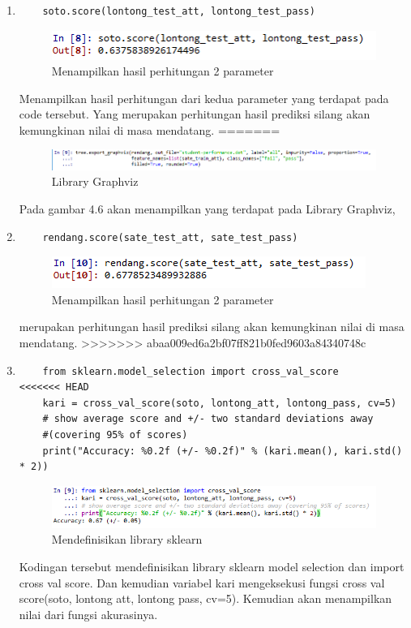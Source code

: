 \begin{enumerate}
\item
\begin{verbatim}
	soto.score(lontong_test_att, lontong_test_pass)
\end{verbatim}
\begin{figure}[ht]
\centering
\includegraphics[scale=0.9]{figures/lontong/8.png}
\caption{Menampilkan hasil perhitungan 2 parameter}
\end{figure}
\par
	Menampilkan hasil perhitungan dari kedua parameter yang terdapat pada code tersebut. Yang merupakan perhitungan hasil prediksi silang akan kemungkinan nilai di masa mendatang.
=======
\begin{figure}[ht]
\centering
\includegraphics[scale=0.6]{figures/46.png}
\caption{Library Graphviz}
\end{figure}
\par
	Pada gambar 4.6 akan menampilkan yang terdapat pada Library Graphviz,
\item
\begin{verbatim}
	rendang.score(sate_test_att, sate_test_pass)
\end{verbatim}
\begin{figure}[ht]
\centering
\includegraphics[scale=0.9]{figures/47.png}
\caption{Menampilkan hasil perhitungan 2 parameter}
\end{figure}
\par
	merupakan perhitungan hasil prediksi silang akan kemungkinan nilai di masa mendatang.
>>>>>>> abaa009ed6a2bf07ff821b0fed9603a84340748c

\item
\begin{verbatim}
	from sklearn.model_selection import cross_val_score
<<<<<<< HEAD
	kari = cross_val_score(soto, lontong_att, lontong_pass, cv=5)
	# show average score and +/- two standard deviations away 
	#(covering 95% of scores)
	print("Accuracy: %0.2f (+/- %0.2f)" % (kari.mean(), kari.std() * 2))
\end{verbatim}
\begin{figure}[ht]
\centering
\includegraphics[scale=0.6]{figures/lontong/9.png}
\caption{Mendefinisikan library sklearn}
\end{figure}
\par
	Kodingan tersebut mendefinisikan library sklearn model selection dan import cross val score. Dan kemudian variabel kari mengeksekusi fungsi cross val score(soto, lontong att, lontong pass, cv=5). Kemudian akan menampilkan nilai dari fungsi akurasinya.


\end{enumerate}
